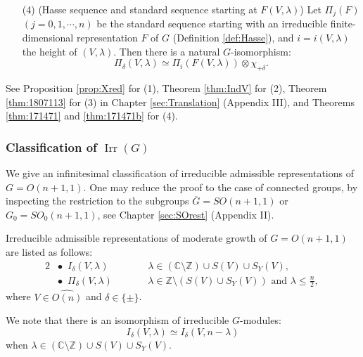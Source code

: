 \begin{theorem}
\begin{enumerate}
\item[{\rm{(4)}}]
{\rm{(Hasse sequence and standard sequence starting at $F(V,\lambda)$)}}
\enspace
{}
Let 
$\Pi_j(F)$
 $(j=0,1,\cdots,n)$
 be the standard sequence 
 starting with an irreducible finite-dimensional 
 representation $F$ of $G$
 (Definition \ref{def:Hasse}), 
 and $i=i(V,\lambda)$ the height of $(V,\lambda)$.  
Then there is a natural $G$-isomorphism:
\[
\Pi_{\delta}(V, \lambda)
\simeq
\Pi_{i}(F(V,\lambda)) \otimes \chi_{+\delta}. 
\]
\end{enumerate}
\end{theorem}

See Proposition \ref{prop:Xred} for (1), 
 Theorem \ref{thm:IndV} for (2), 
 Theorem \ref{thm:1807113} for (3)
 in Chapter \ref{sec:Translation}
 (Appendix III), 
 and Theorems \ref{thm:171471} and \ref{thm:171471b} for (4).  


\subsubsection{Classification of $\operatorname{Irr}(G)$}
\label{subsec:IrrG}
We give an infinitesimal classification 
 of irreducible admissible representations of $G=O(n+1,1)$.  
One may reduce the proof to the case 
 of connected groups, 
 by inspecting the restriction 
 to the subgroups $\overline G=SO(n+1,1)$
 or $G_0=SO_0(n+1,1)$, 
 see Chapter \ref{sec:SOrest} (Appendix II).  


\begin{theorem}
\label{thm:irrG}
Irreducible admissible representations
 of moderate growth
 of $G=O(n+1,1)$ are listed as follows:
\begin{alignat*}{2}
&\bullet\enspace I_{\delta}(V, \lambda)
\qquad
&& \lambda \in ({\mathbb{C}} \setminus {\mathbb{Z}}) \cup S(V) \cup S_Y(V), 
\\
&\bullet\enspace 
\Pi_{\delta}(V, \lambda)
\qquad
&&\text{$\lambda \in {\mathbb{Z}} \setminus (S(V) \cup S_Y(V))$ and $\lambda \le \frac n 2$, }
\end{alignat*}
where $V \in \widehat{O(n)}$
 and $\delta \in \{\pm\}$.  
\end{theorem}
We note that there is an isomorphism
 of irreducible $G$-modules:
\[
  I_{\delta}(V, \lambda)\simeq I_{\delta}(V, n-\lambda)
\]
 when $\lambda \in ({\mathbb{C}} \setminus {\mathbb{Z}}) \cup S(V) \cup S_Y(V)$.  






